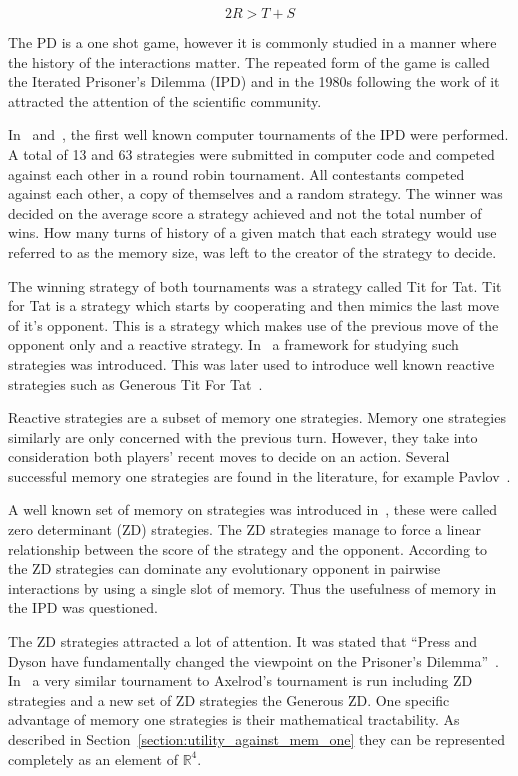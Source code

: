 \documentclass[10pt]{article}
\newcommand{\R}{\mathbb{R}}
\begin{document}
\begin{equation}\label{eq:pd_constrain_two}
    2R > T + S
\end{equation}

The PD is a one shot game, however it is commonly studied in a manner where the
history of the interactions matter. The repeated form of the game is called the
Iterated Prisoner's Dilemma (IPD) and in the 1980s following the work of
\cite{Axelrod1980a, Axelrod1980b} it attracted the attention of the scientific
community.

In~\cite{Axelrod1980a} and~\cite{Axelrod1980b}, the first well known computer
tournaments of the IPD were performed. A total of 13 and 63 strategies were submitted
in computer code and competed against each other in a round robin tournament.
All contestants competed against each other, a copy of themselves and a random strategy.
The winner was decided on the average score a strategy achieved and not the total number
of wins. How many turns of history of a given match that each strategy would use
referred to as the memory size, was left to the creator of the strategy to decide.

The winning strategy of both tournaments was a strategy called Tit for Tat. Tit for Tat
is a strategy which starts by cooperating and then mimics the last move of
it's opponent. This is a strategy which makes use of the previous move of the opponent
only and a reactive strategy. In~\cite{Nowak1989} a framework for
studying such strategies was introduced. This was later used to introduce well known
reactive strategies such as Generous Tit For Tat~\cite{Nowak1990}.

Reactive strategies are a subset of memory one strategies. Memory one strategies
similarly are only concerned with the previous turn. However, they take into consideration
both players' recent moves to decide on an action. Several successful memory one
strategies are found in the literature, for example Pavlov~\cite{Nowak1993}.

A well known set of memory on strategies was introduced in~\cite{Press2012},
these were called zero determinant (ZD) strategies. The ZD strategies manage to force a linear
relationship between the score of the strategy and the opponent. According to~\cite{Press2012}
the ZD strategies can dominate any evolutionary opponent in pairwise
interactions by using a single slot of memory. Thus the usefulness of memory in
the IPD was questioned.

The ZD strategies attracted a lot of attention. It was stated that
``Press and Dyson have fundamentally changed the viewpoint on the Prisoner's
Dilemma''~\cite{Stewart2012}. In~\cite{Stewart2012} a very similar tournament to Axelrod's
tournament is run including ZD strategies and a new set of ZD strategies the Generous
ZD. One specific advantage of memory one strategies is their mathematical tractability.
As described in Section~\ref{section:utility_against_mem_one}
they can be represented completely as an element of \(\R^{4}\).
\end{document}
